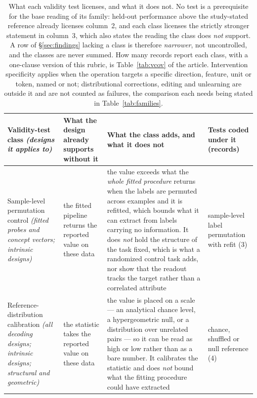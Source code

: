 \begin{table}
\centering\footnotesize\setlength\tabcolsep{4pt}\renewcommand{\arraystretch}{1.05}
\caption{What each validity test licenses, and what it does not. No test is a prerequisite for the base reading of its family: held-out performance above the study-stated reference already licenses column~2, and each class licenses the strictly stronger statement in column~3, which also states the reading the class does \emph{not} support. A row of \S\ref{sec:findings} lacking a class is therefore \emph{narrower}, not uncontrolled, and the classes are never summed. How many records report each class, with a one-clause version of this rubric, is Table~\ref{tab:vcov} of the article. Intervention specificity applies when the operation targets a specific direction, feature, unit or token, named or not; distributional corrections, editing and unlearning are outside it and are not counted as failures, the comparison each needs being stated in Table~\ref{tab:families}.}
\label{tab:rubric}
\begin{tabular}{@{}L{3.2cm}L{4.0cm}L{11.6cm}L{4.0cm}@{}}
\toprule
Validity-test class \emph{(designs it applies to)} & What the design already supports without it & What the class adds, and what it does not & Tests coded under it (records) \\
\midrule
Sample-level permutation control \emph{(fitted probes and concept vectors; intrinsic designs)} & the fitted pipeline returns the reported value on these data & the value exceeds what the \emph{whole fitted procedure} returns when the labels are permuted across examples and it is refitted, which bounds what it can extract from labels carrying no information. It does \emph{not} hold the structure of the task fixed, which is what a randomized control task adds, nor show that the readout tracks the target rather than a correlated attribute & sample-level label permutation with refit (3) \\
Reference-distribution calibration \emph{(all decoding designs; intrinsic designs; structural and geometric)} & the statistic takes the reported value on these data & the value is placed on a scale --- an analytical chance level, a hypergeometric null, or a distribution over unrelated pairs --- so it can be read as high or low rather than as a bare number. It calibrates the statistic and does \emph{not} bound what the fitting procedure could have extracted & chance, shuffled or null reference (4) \\

\end{tabular}
\end{table}
